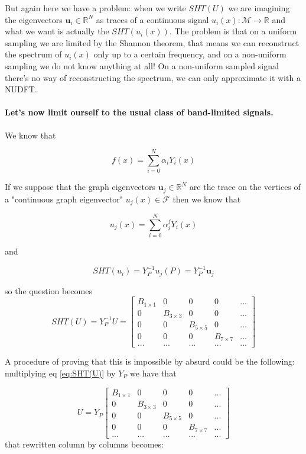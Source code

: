 But again here we have a problem: when we write $SHT(U)$ we are imagining the eigenvectors $\mathbf u_i\in \mathbb R^N$ as traces of a continuous signal $u_i(x): \mathcal M \rightarrow \mathbb R$ and what we want is actually the $SHT(u_i(x))$. The problem is that on a uniform sampling we are limited by the Shannon theorem, that means we can reconstruct the spectrum of $u_i(x)$ only up to a certain frequency, and on a non-uniform sampling we do not know anything at all! On a non-uniform sampled signal there's no way of reconstructing the spectrum, we can only approximate it with a NUDFT. 
\paragraph{Let's now limit ourself to the usual class of band-limited signals.} We know that

$$f(x) = \sum_{i=0}^N \alpha_i Y_i(x)$$

If we suppose that the graph eigenvectors $\mathbf u_j \in \mathbb R^N$ are the trace on the vertices of a "continuous graph eigenvector" $u_j(x) \in \mathcal F$ then we know that 

$$u_j(x) = \sum_{i=0}^N \alpha^j_i Y_i(x)$$

and 

$$SHT(u_i) = Y_P^{-1}u_j(P) = Y_P^{-1}\mathbf u_j$$

so the question becomes
\begin{equation}
SHT(U) = Y_P^{-1}U = \begin{bmatrix}
		B_{1\times 1} & 0 & 0 & 0 & ...\\
		0 & B_{3\times 3} & 0 & 0 & ...\\
		0 & 0 & B_{5\times 5} & 0 & ...\\
		0 & 0 & 0 & B_{7\times 7} & ...\\
		... & ... & ... & ... & ...
		\end{bmatrix} \label{eq:SHT(U)}
\end{equation}


A procedure of proving that this is impossible by absurd could be the following: multiplying eq \ref{eq:SHT(U)} by $Y_P$ we have that

$$
U = Y_P\begin{bmatrix}
B_{1\times 1} & 0 & 0 & 0 & ...\\
0 & B_{3\times 3} & 0 & 0 & ...\\
0 & 0 & B_{5\times 5} & 0 & ...\\
0 & 0 & 0 & B_{7\times 7} & ...\\
... & ... & ... & ... & ...
\end{bmatrix}
$$
 that rewritten column by columns becomes:

